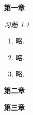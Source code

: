 \documentclass[../book.tex]{subfiles}
\begin{document}
\vspace{1em}
\begin{center}
    {\Large \bfseries 第一章}
\end{center}
\vspace{1em}

\emph{习题 1.1}

\begin{enumerate}
    \item 略. 
    \item 略. 
    \item 略. 
\end{enumerate}

\vspace{1em}
\begin{center}
    {\Large \bfseries 第二章}
\end{center}
\vspace{1em}

\vspace{1em}
\begin{center}
    {\Large \bfseries 第三章}
\end{center}
\vspace{1em}
\end{document}
